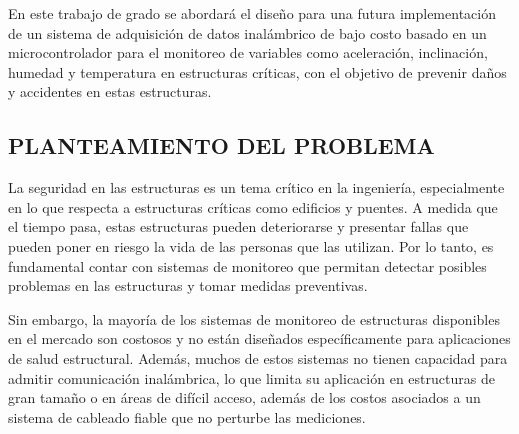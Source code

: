 \documentclass[12pt,letterpaper]{article}
\begin{document}
En este trabajo de grado se abordará el diseño para una futura implementación de un sistema de adquisición de datos inalámbrico de bajo costo basado en un microcontrolador para el monitoreo de variables como aceleración, inclinación, humedad y temperatura en estructuras críticas, con el objetivo de prevenir daños y accidentes en estas estructuras.



\newpage



\begin{center}
	\section*{ PLANTEAMIENTO DEL PROBLEMA}
\end{center}


\vspace{0.3cm}

La seguridad en las estructuras es un tema crítico en la ingeniería, especialmente en lo que respecta a estructuras críticas como edificios y puentes. A medida que el tiempo pasa, estas estructuras pueden deteriorarse y presentar fallas que pueden poner en riesgo la vida de las personas que las utilizan. Por lo tanto, es fundamental contar con sistemas de monitoreo que permitan detectar posibles problemas en las estructuras y tomar medidas preventivas.

Sin embargo, la mayoría de los sistemas de monitoreo de estructuras disponibles en el mercado son costosos y no están diseñados específicamente para aplicaciones de salud estructural. Además, muchos de estos sistemas no tienen capacidad para admitir comunicación inalámbrica, lo que limita su aplicación en estructuras de gran tamaño o en áreas de difícil acceso, además de los costos asociados a un sistema de cableado fiable que no perturbe las mediciones.


\end{document}

